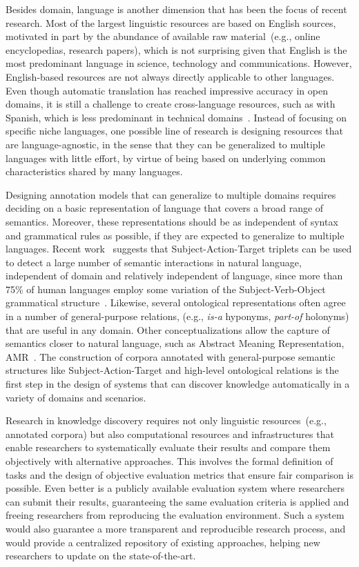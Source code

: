 Besides domain, language is another dimension that has been the focus of recent research.
Most of the largest linguistic resources are based on English sources, motivated in part by the abundance of available raw material~(e.g., online encyclopedias, research papers), which is not surprising given that English is the most predominant language in science, technology and communications.
However, English-based resources are not always directly applicable to other languages.
Even though automatic translation has reached impressive accuracy in open domains, it is still a challenge to create cross-language resources, such as with Spanish, which is less predominant in technical domains~\cite{villegas2018mespen}.
Instead of focusing on specific niche languages, one possible line of research is designing resources that are
language-agnostic, in the sense that they can be generalized to multiple languages with little effort, by virtue
of being based on underlying common characteristics shared by many languages.

Designing annotation models that can generalize to multiple domains requires deciding on a basic representation of language that covers a broad range of semantics.
Moreover, these representations should be as independent of syntax and grammatical rules as possible, if they are
expected to generalize to multiple languages.
Recent work~\cite{estevez2018gathering} suggests that Subject-Action-Target triplets can be used to detect a large number of semantic interactions in natural language, independent of domain and relatively independent of language, since
more than 75\% of human languages employ some variation of the Subject-Verb-Object grammatical structure~\cite{crystal2004cambridge}.
Likewise, several ontological representations often agree in a number of general-purpose relations, (e.g., \textit{is-a} hyponyms, \textit{part-of} holonyms) that are useful in any domain.
Other conceptualizations allow the capture of semantics closer to natural language, such as Abstract Meaning Representation, AMR~\cite{banarescu2013abstract}.
The construction of corpora annotated with general-purpose semantic structures like Subject-Action-Target and high-level ontological relations is the first step in the design of systems that can discover knowledge automatically in a variety of domains and scenarios.

Research in knowledge discovery requires not only linguistic resources~(e.g., annotated corpora) but also computational resources and infrastructures that enable researchers to systematically evaluate their results and compare them objectively with alternative approaches.
This involves the formal definition of tasks and the design of objective evaluation metrics that ensure fair comparison is possible.
Even better is a publicly available evaluation system where researchers can submit their results, guaranteeing the same evaluation criteria is applied and freeing researchers from reproducing the evaluation environment. Such a system would also guarantee a more transparent and reproducible research process, and would provide a centralized repository of existing approaches, helping new researchers to update on the state-of-the-art.


